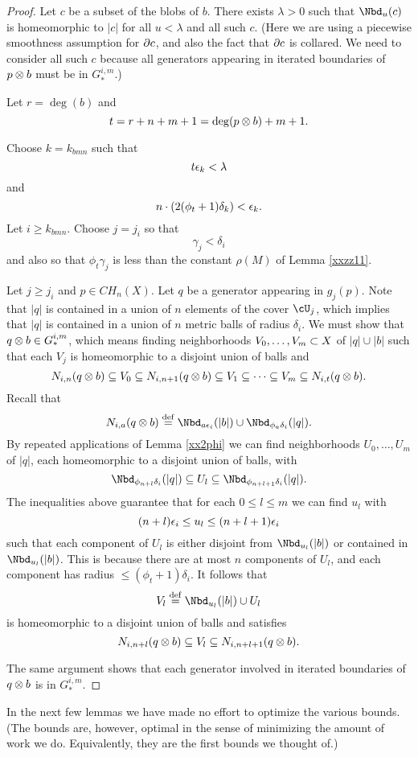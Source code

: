 \begin{proof}
Let $c$ be a subset of the blobs of $b$.
There exists $\lambda > 0$ such that $\Nbd_u(c)$ is homeomorphic to $|c|$ for all $u < \lambda$ 
and all such $c$.
(Here we are using a piecewise smoothness assumption for $\partial c$, and also
the fact that $\partial c$ is collared.
We need to consider all such $c$ because all generators appearing in
iterated boundaries of $p\otimes b$ must be in $G_*^{i,m}$.)

Let $r = \deg(b)$ and 
\[
	t = r+n+m+1 = \deg(p\otimes b) + m + 1.
\]

Choose $k = k_{bmn}$ such that
\[
	t\epsilon_k < \lambda
\]
and
\[
	n\cdot (2 (\phi_t + 1) \delta_k) < \epsilon_k .
\]
Let $i \ge k_{bmn}$.
Choose $j = j_i$ so that
\[
	\gamma_j < \delta_i
\]
and also so that $\phi_t \gamma_j$ is less than the constant $\rho(M)$ of Lemma \ref{xxzz11}.

Let $j \ge j_i$ and $p\in CH_n(X)$.
Let $q$ be a generator appearing in $g_j(p)$.
Note that $|q|$ is contained in a union of $n$ elements of the cover $\cU_j$,
which implies that $|q|$ is contained in a union of $n$ metric balls of radius $\delta_i$.
We must show that $q\otimes b \in G_*^{i,m}$, which means finding neighborhoods
$V_0,\ldots,V_m \subset X$ of $|q|\cup |b|$ such that each $V_j$
is homeomorphic to a disjoint union of balls and
\[
	N_{i,n}(q\otimes b) \subseteq V_0 \subseteq N_{i,n+1}(q\otimes b)
			\subseteq V_1 \subseteq \cdots \subseteq V_m \subseteq N_{i,t}(q\otimes b) .
\]
Recall that
\[
	N_{i,a}(q\ot b) \deq \Nbd_{a\ep_i}(|b|) \cup \Nbd_{\phi_a\delta_i}(|q|).
\]
By repeated applications of Lemma \ref{xx2phi} we can find neighborhoods $U_0,\ldots,U_m$
of $|q|$, each homeomorphic to a disjoint union of balls, with
\[
	\Nbd_{\phi_{n+l} \delta_i}(|q|) \subeq U_l \subeq \Nbd_{\phi_{n+l+1} \delta_i}(|q|) .
\]
The inequalities above guarantee that 
for each $0\le l\le m$ we can find $u_l$ with 
\[
	(n+l)\epsilon_i \le u_l \le (n+l+1)\epsilon_i
\]
such that each component of $U_l$ is either disjoint from $\Nbd_{u_l}(|b|)$ or contained in 
$\Nbd_{u_l}(|b|)$.
This is because there are at most $n$ components of $U_l$, and each component
has radius $\le (\phi_t + 1) \delta_i$.
It follows that
\[
	V_l \deq \Nbd_{u_l}(|b|) \cup U_l
\]
is homeomorphic to a disjoint union of balls and satisfies
\[
	N_{i,n+l}(q\otimes b) \subseteq V_l \subseteq N_{i,n+l+1}(q\otimes b) .
\]

The same argument shows that each generator involved in iterated boundaries of $q\otimes b$
is in $G_*^{i,m}$.
\end{proof}

In the next few lemmas we have made no effort to optimize the various bounds.
(The bounds are, however, optimal in the sense of minimizing the amount of work
we do.  Equivalently, they are the first bounds we thought of.)

